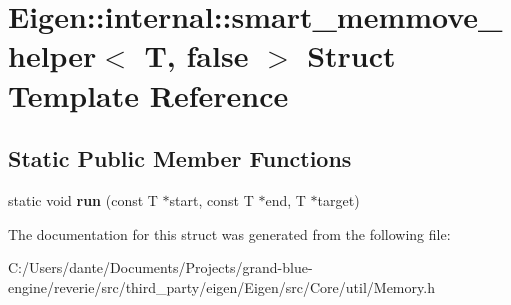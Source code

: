 \hypertarget{struct_eigen_1_1internal_1_1smart__memmove__helper_3_01_t_00_01false_01_4}{}\section{Eigen\+::internal\+::smart\+\_\+memmove\+\_\+helper$<$ T, false $>$ Struct Template Reference}
\label{struct_eigen_1_1internal_1_1smart__memmove__helper_3_01_t_00_01false_01_4}
\subsection*{Static Public Member Functions}
\begin{DoxyCompactItemize}
\item 
\mbox{\label{struct_eigen_1_1internal_1_1smart__memmove__helper_3_01_t_00_01false_01_4_a31722a9391830fcb006054b009fb8e2c}} 
static void {\bfseries run} (const T $\ast$start, const T $\ast$end, T $\ast$target)
\end{DoxyCompactItemize}


The documentation for this struct was generated from the following file\+:\begin{DoxyCompactItemize}
\item 
C\+:/\+Users/dante/\+Documents/\+Projects/grand-\/blue-\/engine/reverie/src/third\+\_\+party/eigen/\+Eigen/src/\+Core/util/Memory.\+h\end{DoxyCompactItemize}
